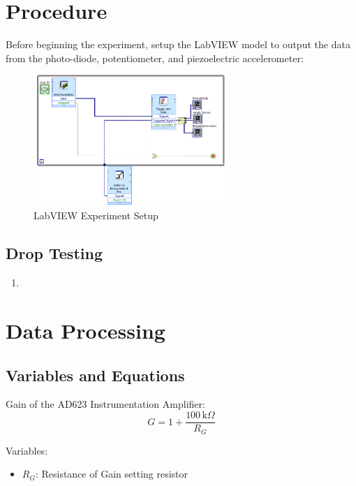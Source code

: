 \documentclass{article}
\begin{document}
\section{Procedure}
Before beginning the experiment, setup the LabVIEW model to output the data from the photo-diode, potentiometer, and piezoelectric accelerometer:

\begin{figure}[H]
    \centering
    \includegraphics[width=0.65\textwidth]{lab8images/lab8blockdiag.PNG}
    \caption{LabVIEW Experiment Setup}
    \label{fig:labview}
\end{figure}

\subsection{Drop Testing}
\begin{enumerate}
    \item 
\end{enumerate}

\hypertarget{datapro}{}
\section{Data Processing}
\subsection{Variables and Equations}  

Gain of the AD623 Instrumentation Amplifier:
\begin{equation}
    G = 1 + \dfrac{100\, \text{k}\Omega}{R_{G}}
\end{equation}

Variables:
\begin{itemize}
    \item \(R_{G}\): Resistance of Gain setting resistor
\end{itemize}
\vspace{5mm}
\end{document}
